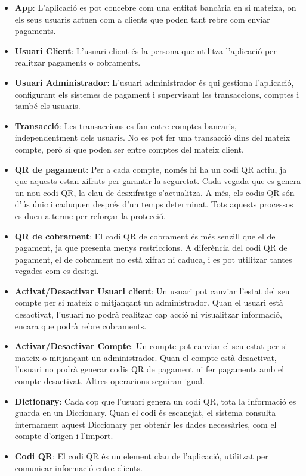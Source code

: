 \documentclass[a4paper,12pt,twoside]{ThesisStyle}
\begin{document}
\begin{itemize}
    \item \textbf{App}: L'aplicació es pot concebre com una entitat bancària en si mateixa, on els seus usuaris actuen com a clients que poden tant rebre com enviar pagaments. 
    \item \textbf{Usuari Client}: L'usuari client és la persona que utilitza l'aplicació per realitzar pagaments o cobraments.
    \item \textbf{Usuari Administrador}: L'usuari administrador és qui gestiona l'aplicació, configurant els sistemes de pagament i supervisant les transaccions, comptes i també els usuaris.
    \item \textbf{Transacció}: Les transaccions es fan entre comptes bancaris, independentment dels usuaris. No es pot fer una transacció dins del mateix compte, però sí que poden ser entre comptes del mateix client.
    \item \textbf{QR de pagament}: Per a cada compte, només hi ha un codi QR actiu, ja que aquests estan xifrats per garantir la seguretat. Cada vegada que es genera un nou codi QR, la clau de desxifratge s’actualitza. A més, els codis QR són d'ús únic i caduquen després d'un temps determinat. Tots aquests processos es duen a terme per reforçar la protecció.
    \item \textbf{QR de cobrament}: El codi QR de cobrament és més senzill que el de pagament, ja que presenta menys restriccions. A diferència del codi QR de pagament, el de cobrament no està xifrat ni caduca, i es pot utilitzar tantes vegades com es desitgi.
    \item \textbf{Activat/Desactivar Usuari client}: Un usuari pot canviar l'estat del seu compte per si mateix o mitjançant un administrador. Quan el usuari està desactivat, l'usuari no podrà realitzar cap acció ni visualitzar informació, encara que podrà rebre cobraments.
    \item \textbf{Activar/Desactivar Compte}: Un compte pot canviar el seu estat per si mateix o mitjançant un administrador. Quan el compte està desactivat, l'usuari no podrà generar codis QR de pagament ni fer pagaments amb el compte desactivat. Altres operacions seguiran igual.
    \item \textbf{Dictionary}: Cada cop que l'usuari genera un codi QR, tota la informació es guarda en un Diccionary. Quan el codi és escanejat, el sistema consulta internament aquest Diccionary per obtenir les dades necessàries, com el compte d'origen i l'import.
    \item \textbf{Codi QR}: El codi QR és un element clau de l'aplicació, utilitzat per comunicar informació entre clients.
\end{itemize}
\end{document}

